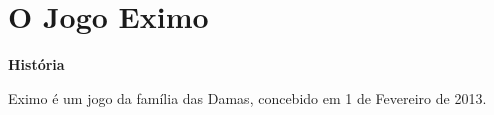 \documentclass[a4paper]{article}
\begin{document}
\newpage

\section{O Jogo Eximo}

\large{\textbf{História}}
\begin{small}

Eximo é um jogo da família das Damas, concebido em 1 de Fevereiro de 2013.\newline
\end{small}
\end{document}
